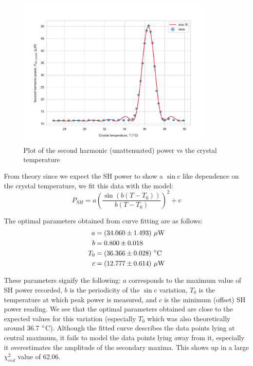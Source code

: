 \begin{figure}[H]
\includegraphics[width=0.9\textwidth]{./imagesandplots/shpowvstemp.pdf}
\centering
\caption{Plot of the second harmonic (unattenuated) power vs the crystal temperature}
\label{figexpt8}
\end{figure} 
 
From theory since we expect the SH power to show a $\sin$c like dependence on the crystal temperature, we fit this data with the model:
\begin{equation}
P_{SH}=a\left(\dfrac{\sin(b(T-T_{0}))}{b(T-T_{0})}\right)^{2}+c
\end{equation}

The optimal parameters obtained from curve fitting are as follows:
\begin{align}
a&=(34.060 \pm 1.493)\ \mu\rm{W}\\
b&=0.800\pm 0.018\\
T_{0}&=(36.366\pm 0.028)\ \degree \rm{C}\\
c&=(12.777\pm 0.614)\ \mu\rm{W}
\end{align}

These parameters signify the following: $a$ corresponds to the maximum value of SH power recorded, $b$ is the periodicity of the $\sin$c variation, $T_{0}$ is the temperature at which peak power is measured, and $c$ is the minimum (offset) SH power reading. We see that the optimal parameters obtained are close to the expected values for this variation (especially $T_{0}$ which was also theoretically around 36.7 $\degree$C). Although the fitted curve describes the data points lying at central maximum, it fails to model the data points lying away from it, especially it overestimates the amplitude of the secondary maxima. This shows up in a large $\chi_{red}^{2}$ value of 62.06.

